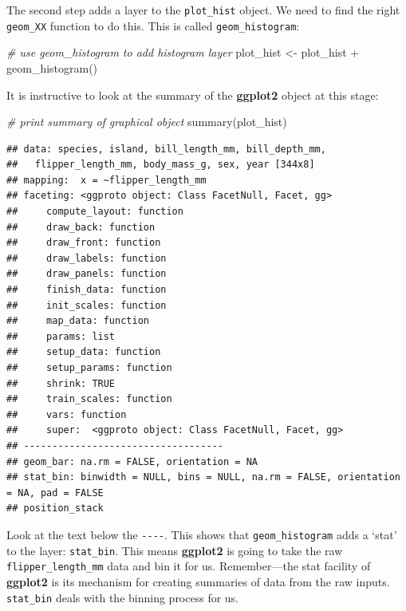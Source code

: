\documentclass[
]{book}
\newenvironment{Shaded}{\begin{snugshade}}{\end{snugshade}}
\newcommand{\CommentTok}[1]{\textcolor[rgb]{0.56,0.35,0.01}{\textit{#1}}}
\newcommand{\FunctionTok}[1]{\textcolor[rgb]{0.00,0.00,0.00}{#1}}
\newcommand{\NormalTok}[1]{#1}
\newcommand{\OtherTok}[1]{\textcolor[rgb]{0.56,0.35,0.01}{#1}}
\newcommand{\SpecialCharTok}[1]{\textcolor[rgb]{0.00,0.00,0.00}{#1}}
\begin{document}
The second step adds a layer to the \texttt{plot\_hist} object. We need to find the right \texttt{geom\_XX} function to do this. This is called \texttt{geom\_histogram}:

\begin{Shaded}
\begin{Highlighting}[]
\CommentTok{\# use geom\_histogram to add histogram layer}
\NormalTok{plot\_hist }\OtherTok{\textless{}{-}}\NormalTok{ plot\_hist }\SpecialCharTok{+} \FunctionTok{geom\_histogram}\NormalTok{()}
\end{Highlighting}
\end{Shaded}

It is instructive to look at the summary of the \textbf{ggplot2} object at this stage:

\begin{Shaded}
\begin{Highlighting}[]
\CommentTok{\# print summary of graphical object}
\FunctionTok{summary}\NormalTok{(plot\_hist)}
\end{Highlighting}
\end{Shaded}

\begin{verbatim}
## data: species, island, bill_length_mm, bill_depth_mm,
##   flipper_length_mm, body_mass_g, sex, year [344x8]
## mapping:  x = ~flipper_length_mm
## faceting: <ggproto object: Class FacetNull, Facet, gg>
##     compute_layout: function
##     draw_back: function
##     draw_front: function
##     draw_labels: function
##     draw_panels: function
##     finish_data: function
##     init_scales: function
##     map_data: function
##     params: list
##     setup_data: function
##     setup_params: function
##     shrink: TRUE
##     train_scales: function
##     vars: function
##     super:  <ggproto object: Class FacetNull, Facet, gg>
## -----------------------------------
## geom_bar: na.rm = FALSE, orientation = NA
## stat_bin: binwidth = NULL, bins = NULL, na.rm = FALSE, orientation = NA, pad = FALSE
## position_stack
\end{verbatim}

Look at the text below the \texttt{-\/-\/-\/-}. This shows that \texttt{geom\_histogram} adds a `stat' to the layer: \texttt{stat\_bin}. This means \textbf{ggplot2} is going to take the raw \texttt{flipper\_length\_mm} data and bin it for us. Remember---the stat facility of \textbf{ggplot2} is its mechanism for creating summaries of data from the raw inputs. \texttt{stat\_bin} deals with the binning process for us.
\end{document}
